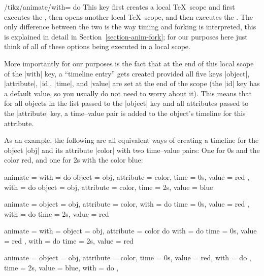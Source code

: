 \begin{key}{/tikz/animate/with= do }
  This key first creates a local \TeX\ scope and first executes the
  , then opens another local \TeX\ scope, and then
  executes the . The only difference between the
  two is the way timing and forking is interpreted, this is explained
  in detail in Section~\ref{section-anim-fork}; for our purposes here
  just think of all of these options being executed in a local scope.

  More importantly for our purposes is the fact that at the end
  of this local scope of the |with| key, a ``timeline
  entry'' gets created provided all five keys |object|, |attribute|,
  |id|, |time|, and |value| are set at the end of the scope (the |id|
  key has a default value, so you usually do not need to worry about
  it). This means that for all objects in the list passed to the
  |object| key and all attributes passed to the |attribute| key, a
  time--value pair is added to the object's timeline for this
  attribute.

  As an example, the following are all equivalent ways of creating a
  timeline for the object |obj| and its attribute |color| with two
  time--value pairs: One for 0s and the color red, and one for 2s with
  the color blue:
\begin{codeexample}
animate = { %
  with = {} do { object = obj, attribute = color, time = 0s, value = red },
  with = {} do { object = obj, attribute = color, time = 2s, value = blue }
}
\end{codeexample}
\begin{codeexample}
animate = { %
  object = obj, attribute = color,
  with = {} do { time = 0s, value = red },
  with = {} do { time = 2s, value = red }
}
\end{codeexample}
\begin{codeexample}
animate = { %
  with = {object = obj, attribute = color} do {
    with = {} do { time = 0s, value = red },
    with = {} do { time = 2s, value = red }
  } %
}
\end{codeexample}
\begin{codeexample}
animate = { %
  object = obj, attribute = color,
  time = 0s, value = red, with = {} do {},
  time = 2s, value = blue, with = {} do {},
}
\end{codeexample}


\end{key}
